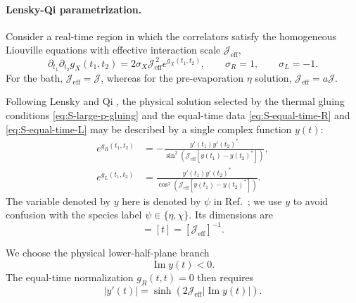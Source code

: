 \documentclass[11pt,a4paper]{article}
\begin{document}
\paragraph*{Lensky-Qi parametrization.}

Consider a real-time region in which the correlators satisfy the homogeneous
Liouville equations with effective interaction scale
\(\mathcal J_{\mathrm{eff}}\),
\begin{equation}
\partial_{t_1}\partial_{t_2}g_X(t_1,t_2)
=
2\sigma_X\mathcal J_{\mathrm{eff}}^{\,2}
e^{g_X(t_1,t_2)},
\qquad
\sigma_R=1,
\qquad
\sigma_L=-1 .
\label{eq:S6-LQ-Liouville}
\end{equation}
For the bath,
\(\mathcal J_{\mathrm{eff}}=\mathcal J\), whereas for the
pre-evaporation \(\eta\) solution,
\(\mathcal J_{\mathrm{eff}}=a\mathcal J\).

Following Lensky and Qi \cite{lensky2021rescuing}, the physical solution
selected by the thermal gluing conditions
\eqref{eq:S-large-p-gluing} and the equal-time data
\eqref{eq:S-equal-time-R} and \eqref{eq:S-equal-time-L} may be described by
a single complex function \(y(t)\):
\begin{equation}
\begin{aligned}
e^{g_R(t_1,t_2)}
&=
-
\frac{
y'(t_1)y'(t_2)^*
}{
\sin^2\left(
\mathcal J_{\mathrm{eff}}
\left[y(t_1)-y(t_2)^*\right]
\right)
},
\\
e^{g_L(t_1,t_2)}
&=
\frac{
y'(t_1)y'(t_2)^*
}{
\cos^2\left(
\mathcal J_{\mathrm{eff}}
\left[y(t_1)-y(t_2)^*\right]
\right)
}.
\end{aligned}
\label{eq:S6-LQ-parametrization}
\end{equation}
The variable denoted by \(y\) here is denoted by \(\psi\) in
Ref.~\cite{lensky2021rescuing}; we use \(y\) to avoid confusion with the
species label \(\psi\in\{\eta,\chi\}\). Its dimensions are
\begin{equation}
[y]=[t]=[\mathcal J_{\mathrm{eff}}]^{-1}.
\label{eq:S6-y-dimension}
\end{equation}

We choose the physical lower-half-plane branch
\begin{equation}
\operatorname{Im}y(t)<0 .
\label{eq:S6-physical-branch}
\end{equation}
The equal-time normalization \(g_R(t,t)=0\) then requires
\begin{equation}
|y'(t)|
=
\sinh\left(
2\mathcal J_{\mathrm{eff}}
|\operatorname{Im}y(t)|
\right).
\label{eq:S6-y-normalization}
\end{equation}
\end{document}
